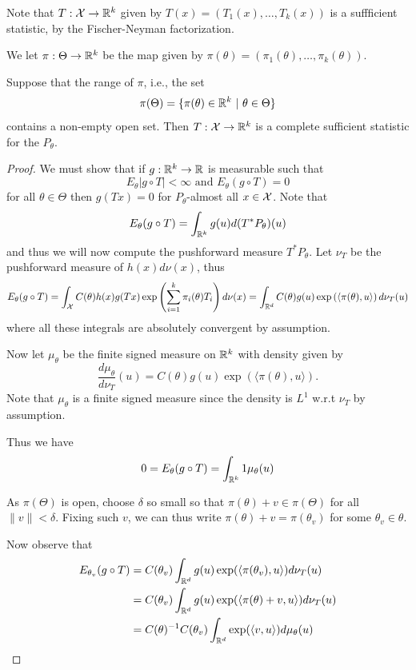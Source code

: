 \documentclass[twoside, a4paper, 10pt]{amsart}
\begin{document}
Note that $T:\mathcal{X} \to \mathbb{R}^k$ given by $T(x) = (T_1(x),\ldots, T_k(x))$ is a suffficient statistic, by the Fischer-Neyman factorization.

We let $\pi:\Theta \to \mathbb{R}^k$ be the map given by $\pi(\theta) = (\pi_1(\theta), \ldots, \pi_k(\theta))$. 

\begin{prop} Suppose that the range of $\pi$, i.e., the set $$\pi(\Theta) = \{ \pi(\theta) \in \mathbb{R}^k ~|~ \theta \in \Theta\}$$ contains a non-empty open set. Then $T:\mathcal{X} \to \mathbb{R}^k$ is a complete sufficient statistic for the $P_{\theta}$.

\end{prop}

\begin{proof} We must show that if $g:\mathbb{R}^k \to \mathbb{R}$ is measurable such that $$E_{\theta}|g \circ T| < \infty \text{ and } E_{\theta}(g \circ T) = 0$$ for all $\theta \in \Theta$ then $g(Tx) = 0$ for $P_{\theta}$-almost all $x \in \mathcal{X}$. Note that $$E_{\theta}(g \circ T) = \int_{\mathbb{R}^k} g(u) d(T^*P_{\theta})(u)$$ and thus we will now compute the pushforward measure $T^*P_{\theta}$. Let $\nu_T$ be the pushforward measure of $h(x)d\nu(x)$, thus 
$$E_{\theta}(g \circ T) = \int_{\mathcal{X}} C(\theta)h(x)g(Tx)\exp\left(\sum_{i=1}^k \pi_i(\theta) T_i \right)  d\nu(x) = \int_{\mathbb{R}^d} C(\theta)g(u)\exp\left(\langle \pi(\theta),u \rangle \right)  d\nu_T(u)$$ 
where all these integrals are absolutely convergent by assumption.

Now let $\mu_{\theta}$ be the finite signed measure on $\mathbb{R}^k$ with density given by 
$$\frac{d\mu_{\theta}}{d\nu_T}(u) = C(\theta)g(u)\exp\left(\langle \pi(\theta),u \rangle \right).$$ 
Note that $\mu_{\theta}$ is a finite signed measure since the density is $L^1$ w.r.t $\nu_T$ by assumption. 

Thus we have $$0 = E_{\theta}(g \circ T) = \int_{\mathbb{R}^k} 1 \mu_{\theta}(u)$$

As $\pi(\Theta)$ is open, choose $\delta$ so small so that $\pi(\theta) + v \in \pi(\Theta)$ for all $\|v\| < \delta$. Fixing such $v$, we can thus write $\pi(\theta) + v = \pi(\theta_v)$ for some $\theta_v \in \theta$.

Now observe that 
\begin{align*} 
E_{\theta_v}(g \circ T) &= C(\theta_v) \int_{\mathbb{R}^d} g(u) \exp(\langle\pi(\theta_v), u \rangle) d\nu_T(u) \\ 
&=C(\theta_v) \int_{\mathbb{R}^d} g(u) \exp(\langle\pi(\theta) + v, u \rangle) d\nu_T(u) \\ 
&= C(\theta)^{-1}C(\theta_v) \int_{\mathbb{R}^d} \exp(\langle v, u \rangle) d\mu_{\theta}(u) \end{align*}


\end{proof}
\end{document}
